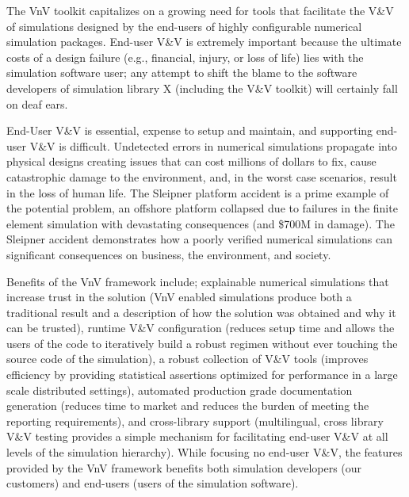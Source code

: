The VnV toolkit capitalizes on a growing need for tools that facilitate the V\&V of simulations designed by the end-users of highly configurable numerical simulation packages. End-user V\&V is extremely important because the ultimate costs of a design failure (e.g., financial, injury, or loss of life) lies with the simulation software user; any attempt to shift the blame to the software developers of simulation library X (including the V\&V toolkit) will certainly fall on deaf ears. 

End-User V\&V is essential, expense to setup and maintain, and supporting end-user V\&V is difficult. Undetected errors in numerical simulations propagate into physical designs creating issues that can cost millions of dollars to fix, cause catastrophic damage to the environment, and, in the worst case scenarios, result in the loss of human life. The Sleipner platform accident \cite{jakobsen1994sleipner,collins1997failure} is a prime example of the potential problem, an offshore platform collapsed due to failures in the finite element simulation with devastating consequences (and \$700M in damage). The Sleipner accident demonstrates how a poorly verified numerical simulations can significant consequences on business, the environment, and society.

Benefits of the VnV framework include; explainable numerical simulations that increase trust in the solution (VnV enabled simulations produce both a traditional result and a description of how the solution was obtained and why it can be trusted), runtime V\&V configuration (reduces setup time and allows the users of the code to iteratively build a robust \VV regimen without ever touching the source code of the simulation), a robust collection of V\&V tools (improves efficiency by providing statistical assertions optimized for performance in a large scale distributed settings), automated production grade documentation generation (reduces time to market and reduces the burden of meeting the \VV reporting requirements), and cross-library support (multilingual, cross library V\&V testing provides a simple mechanism for facilitating end-user V\&V at all levels of the simulation hierarchy). While focusing no end-user V\&V, the features provided by the VnV framework benefits both simulation developers (our customers) and end-users (users of the simulation software). 

